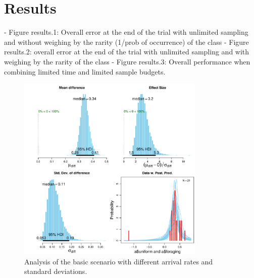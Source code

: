 \section{Results}
\label{sec:results}


- Figure results.1: Overall error at the end of the trial with unlimited sampling and without weighing by the rarity (1/prob of occurrence) of the class
- Figure results.2: overall error at the end of the trial with unlimited sampling and with weighing by the rarity of the class
- Figure results.3: Overall performance when combining limited time and limited sample budgets.


\begin{figure}[htpd]
	\centering
	\includegraphics[width=0.8\textwidth]{images/diff-diff.pdf}
	\caption{Analysis of the basic scenario with different arrival rates and standard deviations.}
	\label{fig:diff-diff}
\end{figure}
